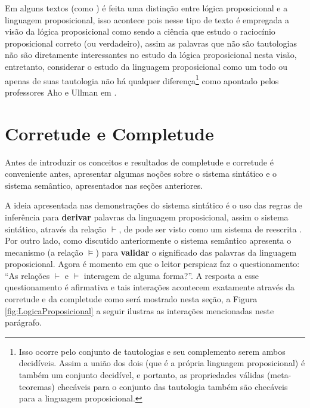 Em alguns textos (como \cite{benja-Logica}) é feita uma distinção entre lógica proposicional e a linguagem proposicional, isso acontece pois nesse tipo de texto é empregada a visão da lógica proposicional como sendo a ciência que estudo o raciocínio proposicional correto (ou verdadeiro), assim as palavras que não são tautologias não são diretamente interessantes no estudo da lógica proposicional nesta visão, entretanto, considerar o estudo da linguagem proposicional como um todo ou apenas de suas tautologia não há qualquer diferença\footnote{Isso ocorre pelo conjunto de tautologias e seu complemento serem ambos decidíveis. Assim a união dos dois (que é a própria linguagem proposicional) é também um conjunto decidível, e portanto, as propriedades válidas (meta-teoremas) checáveis para o conjunto das tautologia também são checáveis para a linguagem proposicional.} como apontado pelos professores Aho e Ullman em \cite{ullman1992}.

\section{Corretude e Completude}\label{sec:CorretudeCompletudeProposicional}

Antes de introduzir os conceitos e resultados de completude e corretude é conveniente antes, apresentar algumas noções sobre o sistema sintático e o sistema semântico, apresentados nas seções anteriores. 

A ideia apresentada nas demonstrações do sistema sintático é o uso das regras de inferência para \textbf{derivar} palavras da linguagem proposicional, assim o sistema sintático, através da relação $\vdash$, de pode ser visto como um sistema de reescrita \cite{ayala2014}. Por outro lado, como discutido anteriormente o sistema semântico apresenta o mecanismo (a relação $\vDash$) para \textbf{validar} o significado das palavras da linguagem proposicional. Agora é momento em que o leitor perspicaz faz o questionamento: ``As relações $\vdash$ e $\vDash$ interagem de alguma forma?''. A resposta a esse questionamento é afirmativa e tais interações acontecem exatamente através da corretude e da completude como será mostrado nesta seção, a Figura \ref{fig:LogicaProposicional} a seguir ilustras as interações mencionadas neste parágrafo.

